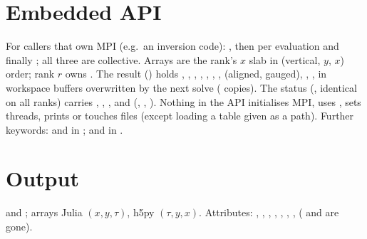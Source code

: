 \section{Embedded API}\label{sec:api}
For callers that own MPI (e.g.\ an inversion code): , then  per
evaluation and finally ; all three are collective. Arrays are the rank's $x$ slab in (vertical,
$y$, $x$) order; rank $r$ owns . The result () holds ,
, , , , , ,  (aligned, gauged),
, , in workspace buffers overwritten by the next solve ( copies). The status
(, identical on all ranks) carries , , ,  and
 (, , ). Nothing in the
API initialises MPI, uses , sets threads, prints or touches files (except loading a table given as a
path). Further keywords:  and  in ;
 and  in .

\adjointcolumntrue


\section{Output}
 and ; arrays Julia
$(x,y,\tau)$, h5py $(\tau,y,x)$. Attributes: , , , , ,
, ,  ( and  are gone).

